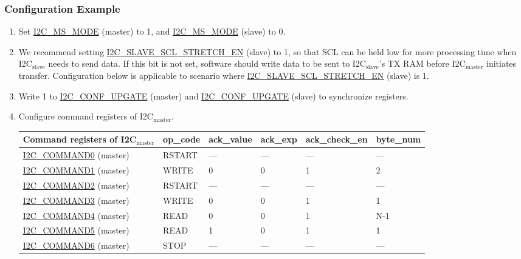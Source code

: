 \documentclass[main\_\_EN.tex]{subfiles}
\begin{document}
\subsubsection{Configuration Example}
\begin{enumerate}
\item Set \hyperref[fielddesc:I2CMSMODE]{I2C\_MS\_MODE} (master) to 1, and \hyperref[fielddesc:I2CMSMODE]{I2C\_MS\_MODE} (slave) to 0.
\item We recommend setting \hyperref[fielddesc:I2CSLAVESCLSTRETCHEN]{I2C\_SLAVE\_SCL\_STRETCH\_EN} (slave) to 1, so that SCL can be held low for more processing time when I2C$_\text{slave}$ needs to send data. If this bit is not set, software should write data to be sent to I2C$_\text{slave}$'s TX RAM before I2C$_\text{master}$ initiates transfer. Configuration below is applicable to scenario where \hyperref[fielddesc:I2CSLAVESCLSTRETCHEN]{I2C\_SLAVE\_SCL\_STRETCH\_EN} (slave) is 1.
\item Write 1 to \hyperref[fielddesc:I2CCONFUPGATE]{I2C\_CONF\_UPGATE} (master) and \hyperref[fielddesc:I2CCONFUPGATE]{I2C\_CONF\_UPGATE} (slave) to synchronize registers.
\item Configure command registers of I2C$_\text{master}$.

\begin{longtable}{ | p{4cm} | p{2cm} | p{2cm} | p{2cm} |p{2cm} | p{2cm} |}
\hline\rowcolor{lightgray}
Command registers of I2C$_\text{master}$& op\_code & ack\_value&ack\_exp&ack\_check\_en&byte\_num  \\ \hline
\hyperref[fielddesc:I2CCOMMAND0]{I2C\_COMMAND0} (master)& RSTART& ---&---&---&---  \\ \hline
\hyperref[fielddesc:I2CCOMMAND1]{I2C\_COMMAND1} (master)& WRITE& 0&0&1&2  \\ \hline
\hyperref[fielddesc:I2CCOMMAND2]{I2C\_COMMAND2} (master)& RSTART& ---&---&---&---  \\ \hline
\hyperref[fielddesc:I2CCOMMAND3]{I2C\_COMMAND3} (master)& WRITE& 0&0&1&1  \\ \hline
\hyperref[fielddesc:I2CCOMMAND4]{I2C\_COMMAND4} (master)& READ& 0&0&1&N-1  \\ \hline
\hyperref[fielddesc:I2CCOMMAND5]{I2C\_COMMAND5} (master)& READ& 1&0&1&1  \\ \hline
\hyperref[fielddesc:I2CCOMMAND6]{I2C\_COMMAND6} (master)& STOP& ---&---&---&---  \\ \hline
\end{longtable}


\end{enumerate}
\end{document}
